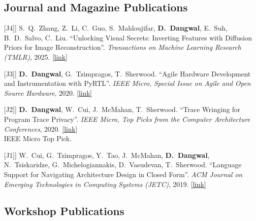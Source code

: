 \documentclass[11pt,letterpaper]{article}
\newcommand{\me}{\textbf{D.~Dangwal}}
\newcommand{\note}[1]{\\ \textcolor{noteRed}{#1}}
\newcommand{\pubtarget}[1]{\raisebox{\baselineskip}[0pt][0pt]{\hypertarget{pub:#1}{}}[#1]}
\newcommand{\paperlink}[1]{\href{#1}{[link]}}
\begin{document}
\subsection{Journal and Magazine Publications}

\begin{publist}
\item[\pubtarget{J4}] S.~Q.~Zhang, Z.~Li, C.~Guo, S.~Mahloujifar, \me, E.~Suh, B.~D.~Salvo, C.~Liu. ``Unlocking Visual Secrets: Inverting Features with Diffusion Priors for Image Reconstruction''. \emph{Transactions on Machine Learning Research (TMLR)}, 2025. \paperlink{https://arxiv.org/pdf/2412.10448}
\item[\pubtarget{J3}] \me, G.~Tzimpragos, T.~Sherwood. ``Agile Hardware Development and Instrumentation with PyRTL''. \emph{IEEE Micro, Special Issue on Agile and Open Source Hardware}, 2020. \paperlink{https://ieeexplore.ieee.org/document/9099999}
\item[\pubtarget{J2}] \me, W.~Cui, J.~McMahan, T.~Sherwood. ``Trace Wringing for Program Trace Privacy''. \emph{IEEE Micro, Top Picks from the Computer Architecture Conferences}, 2020. \paperlink{https://sites.cs.ucsb.edu/~sherwood/pubs/IEEEMicro-20-wringing.pdf}
  \note{IEEE Micro Top Pick.}
\item[\pubtarget{J1}] W.~Cui, G.~Tzimpragos, Y.~Tao, J.~McMahan, \me, N.~Tsiskaridze, G.~Michelogiannakis, D.~Vasudevan, T.~Sherwood. ``Language Support for Navigating Architecture Design in Closed Form''. \emph{ACM Journal on Emerging Technologies in Computing Systems (JETC)}, 2019. \paperlink{https://dl.acm.org/doi/pdf/10.1145/3360047}
\end{publist}

\subsection{Workshop Publications}
\end{document}
